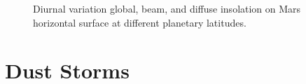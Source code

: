 \begin{figure}[H]
\begin{subfigure}[t]{\subfigureWidth}
  		\label{fig:sub:insolation-phi-p20}
	   \end{subfigure}\hfill
	\caption{Diurnal variation global, beam, and diffuse insolation on Mars horizontal surface at different planetary latitudes.}
	\label{fig:insolation-phi}
\vspace{-2ex}
\end{figure}


\section{Dust Storms}
\label{sec:MartianEnvironment:DustStorms}
%
